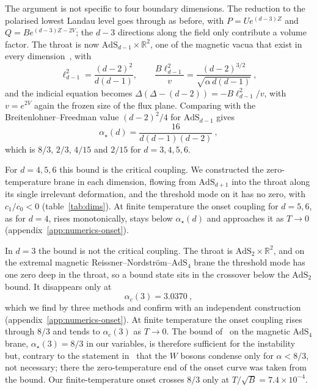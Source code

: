 The argument is not specific to four boundary dimensions. The reduction to
the polarised lowest Landau level goes through as before, with
$P = U e^{(d-3)Z}$ and $Q = B e^{(d-3)Z - 2V}$; the $d - 3$ directions along
the field only contribute a volume factor. The throat is now
$\mathrm{AdS}_{d-1} \times \mathbb{R}^2$, one of the magnetic vacua that
exist in every dimension~\cite{Lu:2013eoa}, with
\begin{equation}
\ell_{d-1}^2 = \frac{(d-2)^2}{d(d-1)}, \qquad \frac{B\ell_{d-1}^2}{v} = \frac{(d-2)^{3/2}}{\sqrt{\alpha\,d(d-1)}}~,
\end{equation}
and the indicial equation becomes $\Delta(\Delta - (d-2)) = -B\ell_{d-1}^2/v$,
with $v = e^{2V}$ again the frozen size of the flux plane. Comparing with
the Breitenlohner--Freedman value $(d-2)^2/4$ for $\mathrm{AdS}_{d-1}$
gives
\begin{equation}
\alpha_\star(d) = \frac{16}{d(d-1)(d-2)}~,
\end{equation}
which is $8/3$, $2/3$, $4/15$ and $2/15$ for $d = 3, 4, 5, 6$.

For $d = 4, 5, 6$ this bound is the critical coupling. We constructed the
zero-temperature brane in each dimension, flowing from
$\mathrm{AdS}_{d+1}$ into the throat along its single irrelevant
deformation, and the threshold mode on it has no zero, with
$c_1/c_0 < 0$ (table~\ref{tab:dims}). At finite temperature the
onset coupling for $d = 5, 6$, as for $d = 4$, rises monotonically, stays
below $\alpha_\star(d)$ and approaches it as $T \to 0$
(appendix~\ref{app:numerics-onset}).

In $d = 3$ the bound is not the critical coupling. The throat is
$\mathrm{AdS}_2 \times \mathbb{R}^2$, and on the extremal magnetic
Reissner--Nordstr\"om--$\mathrm{AdS}_4$ brane the threshold mode has one
zero deep in the throat, so a bound state sits in the crossover below the
$\mathrm{AdS}_2$ bound. It disappears only at
\begin{equation}
\alpha_c(3) = 3.0370~,
\end{equation}
which we find by three methods and confirm with an independent
construction (appendix~\ref{app:numerics-onset}). At finite temperature the
onset coupling rises through $8/3$ and tends to $\alpha_c(3)$ as $T \to 0$.
The bound of~\cite{Wong:2013rda} on the magnetic $\mathrm{AdS}_4$ brane,
$\alpha_\star(3) = 8/3$ in our variables, is therefore sufficient for the
instability but, contrary to the statement in~\cite{Wong:2013rda} that the
$W$ bosons condense only for $\alpha < 8/3$, not necessary; there the
zero-temperature end of the onset curve was taken from the bound. Our
finite-temperature onset crosses $8/3$ only at $T/\sqrt B = 7.4\times10^{-4}$.

